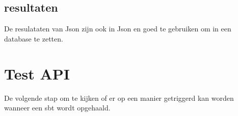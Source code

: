 \subsection{resultaten}\label{subsec:ang-resultaten}
De resulataten van Json zijn ook in Json en goed te gebruiken om in een database te zetten.



\section{Test API}\label{sec:test-api}
De volgende stap om te kijken of er op een manier getriggerd kan worden wanneer een sbt wordt opgehaald.
